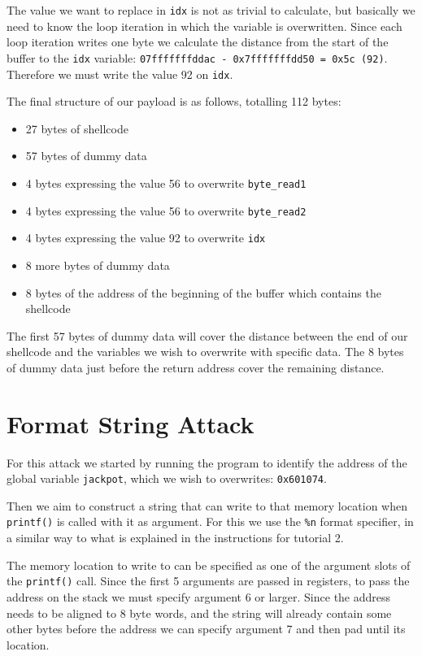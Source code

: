 \documentclass[12pt]{article}
\begin{document}
The value we want to replace in \texttt{idx} is not as trivial to calculate, but basically we need to know the loop iteration in which the variable is overwritten. Since each loop iteration writes one byte we calculate the distance from the start of the buffer to the \texttt{idx} variable: \texttt{07fffffffddac - 0x7fffffffdd50 = 0x5c (92)}. Therefore we must write the value 92 on \texttt{idx}.

The final structure of our payload is as follows, totalling 112 bytes:
\begin{itemize}
    \itemsep0em 
    \item 27 bytes of shellcode
    \item 57 bytes of dummy data
    \item 4 bytes expressing the value 56 to overwrite \texttt{byte\_read1}
    \item 4 bytes expressing the value 56 to overwrite \texttt{byte\_read2}
    \item 4 bytes expressing the value 92 to overwrite \texttt{idx}
    \item 8 more bytes of dummy data
    \item 8 bytes of the address of the beginning of the buffer which contains the shellcode
\end{itemize}

The first 57 bytes of dummy data will cover the distance between the end of our shellcode and the variables we wish to overwrite with specific data. The 8 bytes of dummy data just before the return address cover the remaining distance.



\newpage
\section{Format String Attack}

For this attack we started by running the program to identify the address of the global variable \texttt{jackpot}, which we wish to overwrites: \texttt{0x601074}.

Then we aim to construct a string that can write to that memory location when \texttt{printf()} is called with it as argument. For this we use the \texttt{\%n} format specifier, in a similar way to what is explained in the instructions for tutorial 2.

The memory location to write to can be specified as one of the argument slots of the \texttt{printf()} call. Since the first 5 arguments are passed in registers, to pass the address on the stack we must specify argument 6 or larger. Since the address needs to be aligned to 8 byte words, and the string will already contain some other bytes before the address we can specify argument 7 and then pad until its location. 
\end{document}
